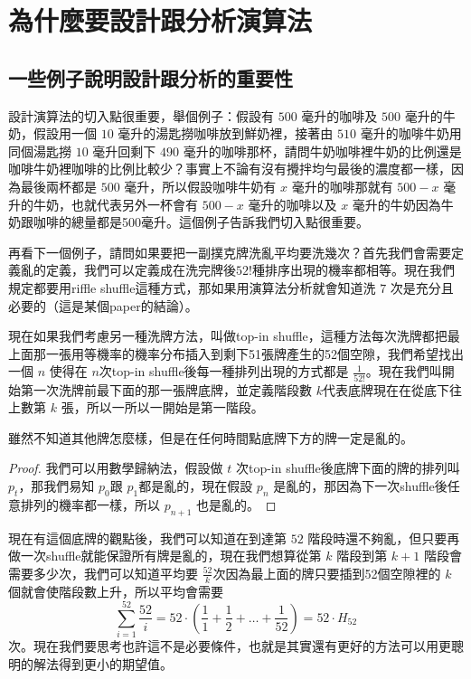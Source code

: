 \chapter{為什麼要設計跟分析演算法}
\section{一些例子說明設計跟分析的重要性}
設計演算法的切入點很重要，舉個例子：假設有 \(500\) 毫升的咖啡及 \(500\) 毫升的牛奶，假設用一個 \(10\) 毫升的湯匙撈咖啡放到鮮奶裡，接著由 \(510\) 毫升的咖啡牛奶用同個湯匙撈 \(10\) 毫升回剩下 \(490\) 毫升的咖啡那杯，請問牛奶咖啡裡牛奶的比例還是咖啡牛奶裡咖啡的比例比較少？事實上不論有沒有攪拌均勻最後的濃度都一樣，因為最後兩杯都是 \(500\) 毫升，所以假設咖啡牛奶有 \(x\) 毫升的咖啡那就有 \(500-x\) 毫升的牛奶，也就代表另外一杯會有 \(500-x\) 毫升的咖啡以及 \(x\) 毫升的牛奶因為牛奶跟咖啡的總量都是500毫升。這個例子告訴我們切入點很重要。

再看下一個例子，請問如果要把一副撲克牌洗亂平均要洗幾次？首先我們會需要定義亂的定義，我們可以定義成在洗完牌後\(52!\)種排序出現的機率都相等。現在我們規定都要用riffle shuffle這種方式，那如果用演算法分析就會知道洗 \(7\) 次是充分且必要的（這是某個paper的結論）。

現在如果我們考慮另一種洗牌方法，叫做top-in shuffle，這種方法每次洗牌都把最上面那一張用等機率的機率分布插入到剩下51張牌產生的52個空隙，我們希望找出一個 \(n\) 使得在 \(n\)次top-in shuffle後每一種排列出現的方式都是 \(\frac{1}{52!}\)。現在我們叫開始第一次洗牌前最下面的那一張牌底牌，並定義階段數 \(k\)代表底牌現在在從底下往上數第 \(k\) 張，所以一所以一開始是第一階段。

\begin{theorem}
雖然不知道其他牌怎麼樣，但是在任何時間點底牌下方的牌一定是亂的。
\end{theorem}
\begin{proof}
我們可以用數學歸納法，假設做 \(t\) 次top-in shuffle後底牌下面的牌的排列叫 \(p_t\)，那我們易知 \(p_0\)跟 \(p_1\)都是亂的，現在假設 \(p_n\) 是亂的，那因為下一次shuffle後任意排列的機率都一樣，所以 \(p_{n+1}\) 也是亂的。     
\end{proof}

現在有這個底牌的觀點後，我們可以知道在到達第 \(52\) 階段時還不夠亂，但只要再做一次shuffle就能保證所有牌是亂的，現在我們想算從第 \(k\) 階段到第 \(k+1\) 階段會需要多少次，我們可以知道平均要 \(\frac{52}{k}\)次因為最上面的牌只要插到52個空隙裡的 \(k\)個就會使階段數上升，所以平均會需要
\[
  \sum_{i=1}^{52} \frac{52}{i} = 52 \cdot \left( \frac{1}{1} + \frac{1}{2} + \dots + \frac{1}{52} \right) = 52 \cdot H_{52} 
\]
次。現在我們要思考也許這不是必要條件，也就是其實還有更好的方法可以用更聰明的解法得到更小的期望值。

